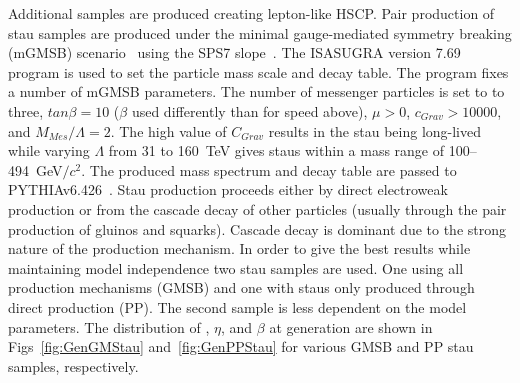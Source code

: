 Additional samples are produced creating lepton-like HSCP. Pair production of stau samples
are produced under the minimal gauge-mediated symmetry breaking (mGMSB) scenario~\cite{Giudice:1998bp} using the SPS7 slope~\cite{Allanach:2002nj}.
The ISASUGRA version 7.69~\cite{Paige:2003mg} program is used to set the particle mass scale and decay table. 
The program fixes a number of mGMSB parameters. The number of messenger particles 
is set to to three, $tan \beta = 10$ ($\beta$ used differently than for speed above), $\mu>0$, $c_{Grav}>10000$, and $M_{Mes}/\Lambda=2$.
The high value of $C_{Grav}$ results in the stau being long-lived while varying $\Lambda$ from 31 to 160~TeV gives staus within a mass range of 100--494~GeV$/c^2$. The produced
mass spectrum and decay table are passed to PYTHIAv6.426~\cite{Sjostrand:2006za}. Stau production proceeds either by direct electroweak production or from the cascade
decay of other particles (usually through the pair production of gluinos and squarks). Cascade decay is dominant due to the strong nature of the production mechanism.
In order to give the best results while maintaining model independence two stau samples are used. One using all production mechanisms (GMSB) and one with staus only
produced through direct production (PP). The second sample is less dependent on the model parameters. The distribution of \pt, $\eta$, and $\beta$ at generation
are shown in Figs~\ref{fig:GenGMStau} and~\ref{fig:GenPPStau} for various GMSB and PP stau samples, respectively.

